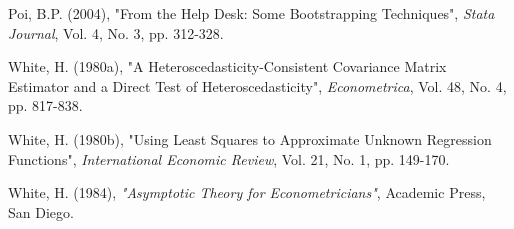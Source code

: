 \documentclass{article}
\begin{document}
\begin{thebibliography}{99}
 Poi, B.P. (2004), "From the Help Desk: Some
Bootstrapping Techniques", \emph{Stata Journal}, Vol. 4, No. 3, pp. 312-328.

 White, H. (1980a), "A Heteroscedasticity-Consistent
Covariance Matrix Estimator and a Direct Test of Heteroscedasticity", \emph{%
Econometrica}, Vol. 48, No. 4, pp. 817-838.

 White, H. (1980b), "Using Least Squares to
Approximate Unknown Regression Functions", \emph{International Economic
Review}, Vol. 21, No. 1, pp. 149-170.

 White, H. (1984), \emph{"Asymptotic Theory for
Econometricians"}, Academic Press, San Diego.
\end{thebibliography}
\end{document}
